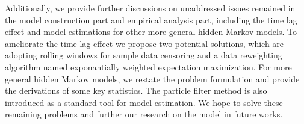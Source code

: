 \begin{bigabstract}
Additionally, we provide further discussions on unaddressed issues remained 
in the model construction part and empirical analysis part,
including the time lag effect and model estimations for other more general hidden Markov models.
To ameliorate the time lag effect we propose two potential solutions,
which are adopting rolling windows for sample data censoring and 
a data reweighting algorithm named exponantially weighted expectation maximization.
For more general hidden Markov models,
we restate the problem formulation and provide the derivations of some key statistics.
The particle filter method is also introduced as a standard tool for model estimation.
We hope to solve these remaining problems and further our research on the model in future works.

\end{bigabstract}
